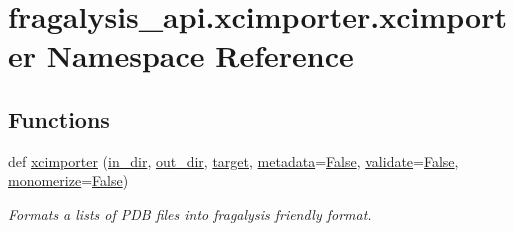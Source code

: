\hypertarget{namespacefragalysis__api_1_1xcimporter_1_1xcimporter}{}\section{fragalysis\+\_\+api.\+xcimporter.\+xcimporter Namespace Reference}
\label{namespacefragalysis__api_1_1xcimporter_1_1xcimporter}
\subsection*{Functions}
\begin{DoxyCompactItemize}
\item 
def \hyperlink{namespacefragalysis__api_1_1xcimporter_1_1xcimporter_a673f390dc6b7d0062ec8d9510079dded}{xcimporter} (\hyperlink{namespacefragalysis__api_1_1xcimporter_1_1xcimporter_a7795d815fddc45b40750fc66e5d8ac4f}{in\+\_\+dir}, \hyperlink{namespacefragalysis__api_1_1xcimporter_1_1xcimporter_a48b550a7c1c2ca499d6f204c133ae41d}{out\+\_\+dir}, \hyperlink{namespacefragalysis__api_1_1xcimporter_1_1xcimporter_a2c93b8722226ac96f6668b2fc07515e8}{target}, \hyperlink{namespacefragalysis__api_1_1xcimporter_1_1xcimporter_a3414d616d16bdcc9b7bbfd56591a406d}{metadata}=\hyperlink{namespacefragalysis__api_1_1xcimporter_1_1xcimporter_a7b54c2ad280b13dc0833892106613e4c}{False}, \hyperlink{namespacefragalysis__api_1_1xcimporter_1_1xcimporter_a07274a26173246021e82b830b0ab30e6}{validate}=\hyperlink{namespacefragalysis__api_1_1xcimporter_1_1xcimporter_a7b54c2ad280b13dc0833892106613e4c}{False}, \hyperlink{namespacefragalysis__api_1_1xcimporter_1_1xcimporter_ad083b3fa69a0bec8eb92ccb08911f2ef}{monomerize}=\hyperlink{namespacefragalysis__api_1_1xcimporter_1_1xcimporter_a7b54c2ad280b13dc0833892106613e4c}{False})
\begin{DoxyCompactList}\small\item\em Formats a lists of P\+DB files into fragalysis friendly format. \end{DoxyCompactList}\end{DoxyCompactItemize}
